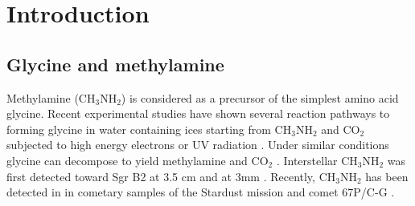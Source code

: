\chapter{Introduction
  \label{chap:introduction}}



\section{Glycine and methylamine}
Methylamine (CH$_3$NH$_2$) is considered as a precursor of the simplest amino acid glycine. 
Recent experimental studies have shown several reaction pathways to forming
glycine in water containing ices starting from CH$_3$NH$_2$ and CO$_2$
subjected to high energy electrons \citep{Holtom+2005} or UV
radiation \citep{Bossa+2009, Lee+2009}. Under similar conditions
glycine can decompose to yield methylamine and CO$_2$
\citep{Ehrenfreund+2001}. Interstellar CH$_3$NH$_2$ was first detected
toward Sgr B2 at 3.5 cm \citep{Fourikis+1974} and at 3mm
\citep{Kaifu+1974}. Recently, CH$_3$NH$_2$ has been detected in
in cometary samples of the Stardust mission \citep{Glavin+2008} and comet 67P/C-G \citep{Altwegg+2016, Altwegg+2017}.


